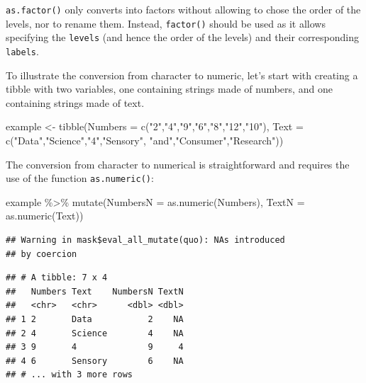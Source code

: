 \documentclass[
]{krantz}
\makeatletter
\newenvironment{Shaded}{\begin{snugshade}}{\end{snugshade}}
\newcommand{\AttributeTok}[1]{\textcolor[rgb]{0.61,0.61,0.61}{#1}}
\newcommand{\FunctionTok}[1]{\textcolor[rgb]{0,0,0}{#1}}
\newcommand{\NormalTok}[1]{#1}
\newcommand{\OtherTok}[1]{\textcolor[rgb]{0.37,0.37,0.37}{#1}}
\newcommand{\SpecialCharTok}[1]{\textcolor[rgb]{0,0,0}{#1}}
\newcommand{\StringTok}[1]{\textcolor[rgb]{0.5,0.5,0.5}{#1}}
\renewenvironment{quote}{\begin{VF}}{\end{VF}}
\newenvironment{kframe}{%
\medskip{}
\setlength{\fboxsep}{.8em}
 \def\at@end@of@kframe{}%
 \ifinner\ifhmode%
  \def\at@end@of@kframe{\end{minipage}}%
  \begin{minipage}{\columnwidth}%
 \fi\fi%
 \def\FrameCommand##1{\hskip\@totalleftmargin \hskip-\fboxsep
 \colorbox{shadecolor}{##1}\hskip-\fboxsep
     \hskip-\linewidth \hskip-\@totalleftmargin \hskip\columnwidth}%
 \MakeFramed {\advance\hsize-\width
   \@totalleftmargin\z@ \linewidth\hsize
   \@setminipage}}%
 {\par\unskip\endMakeFramed%
 \at@end@of@kframe}
\renewenvironment{Shaded}{\begin{kframe}}{\end{kframe}}
\makeatother
\begin{document}
\begin{quote}
\texttt{as.factor()} only converts into factors without allowing to chose the order of the levels, nor to rename them. Instead, \texttt{factor()} should be used as it allows specifying the \texttt{levels} (and hence the order of the levels) and their corresponding \texttt{labels}.
\end{quote}

To illustrate the conversion from character to numeric, let's start with creating a tibble with two variables, one containing strings made of numbers, and one containing strings made of text.

\begin{Shaded}
\begin{Highlighting}[]
\NormalTok{example }\OtherTok{\textless{}{-}} \FunctionTok{tibble}\NormalTok{(}\AttributeTok{Numbers =} \FunctionTok{c}\NormalTok{(}\StringTok{"2"}\NormalTok{,}\StringTok{"4"}\NormalTok{,}\StringTok{"9"}\NormalTok{,}\StringTok{"6"}\NormalTok{,}\StringTok{"8"}\NormalTok{,}\StringTok{"12"}\NormalTok{,}\StringTok{"10"}\NormalTok{),}
                  \AttributeTok{Text =} \FunctionTok{c}\NormalTok{(}\StringTok{"Data"}\NormalTok{,}\StringTok{"Science"}\NormalTok{,}\StringTok{"4"}\NormalTok{,}\StringTok{"Sensory"}\NormalTok{,}
                           \StringTok{"and"}\NormalTok{,}\StringTok{"Consumer"}\NormalTok{,}\StringTok{"Research"}\NormalTok{))}
\end{Highlighting}
\end{Shaded}

The conversion from character to numerical is straightforward and requires the use of the function \texttt{as.numeric()}:

\begin{Shaded}
\begin{Highlighting}[]
\NormalTok{example }\SpecialCharTok{\%\textgreater{}\%} 
  \FunctionTok{mutate}\NormalTok{(}\AttributeTok{NumbersN =} \FunctionTok{as.numeric}\NormalTok{(Numbers), }\AttributeTok{TextN =} \FunctionTok{as.numeric}\NormalTok{(Text))}
\end{Highlighting}
\end{Shaded}

\begin{verbatim}
## Warning in mask$eval_all_mutate(quo): NAs introduced
## by coercion
\end{verbatim}

\begin{verbatim}
## # A tibble: 7 x 4
##   Numbers Text    NumbersN TextN
##   <chr>   <chr>      <dbl> <dbl>
## 1 2       Data           2    NA
## 2 4       Science        4    NA
## 3 9       4              9     4
## 4 6       Sensory        6    NA
## # ... with 3 more rows
\end{verbatim}
\end{document}
